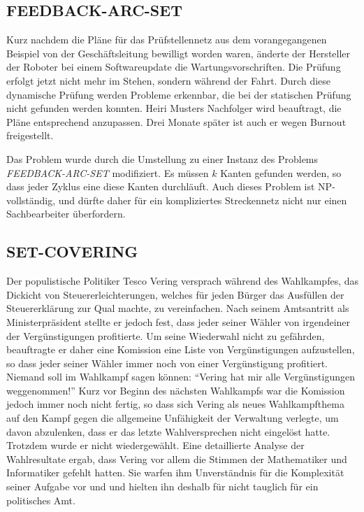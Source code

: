 \subsection{FEEDBACK-ARC-SET}
Kurz nachdem die Pläne für das Prüfstellennetz aus dem vorangegangenen
Beispiel von der Geschäftsleitung bewilligt worden waren, änderte
der Hersteller der Roboter bei einem Softwareupdate die Wartungsvorschriften.
Die Prüfung erfolgt jetzt nicht mehr im Stehen, sondern während der
Fahrt.
Durch diese dynamische Prüfung werden Probleme erkennbar, die bei der
statischen Prüfung nicht gefunden werden konnten. Heiri Musters
Nachfolger wird beauftragt, die Pläne entsprechend anzupassen.
Drei Monate später ist auch er wegen Burnout freigestellt.

\medskip

Das Problem wurde durch die Umstellung zu einer Instanz des
Problems {\it FEEDBACK-ARC-SET} modifiziert.
Es müssen $k$ Kanten gefunden werden, so dass jeder Zyklus eine
diese Kanten durchläuft. Auch dieses Problem ist NP-vollständig,
und dürfte daher für ein kompliziertes Streckennetz
nicht nur einen Sachbearbeiter überfordern.

\subsection{SET-COVERING}
Der populistische Politiker Tesco Vering versprach während des
Wahlkampfes, das Dickicht von Steuererleichterungen, welches
für jeden Bürger das Ausfüllen der Steuererklärung zur Qual
machte, zu vereinfachen.
Nach seinem Amtsantritt als Ministerpräsident 
stellte er jedoch fest, dass jeder seiner Wähler von irgendeiner
der Vergünstigungen profitierte. Um seine Wiederwahl nicht
zu gefährden, beauftragte er daher eine Komission eine Liste
von Vergünstigungen aufzustellen, so dass jeder seiner Wähler
immer noch von einer Vergünstigung profitiert. Niemand soll im
Wahlkampf sagen können: ``Vering hat mir alle Vergünstigungen weggenommen!''
Kurz vor Beginn des nächsten Wahlkampfs war die Komission jedoch
immer noch nicht fertig, so dass sich Vering als neues Wahlkampfthema
auf den Kampf gegen die allgemeine Unfähigkeit der Verwaltung verlegte,
um davon
abzulenken, dass er das letzte Wahlversprechen nicht eingelöst hatte.
Trotzdem wurde er nicht wiedergewählt. Eine detaillierte Analyse der
Wahlresultate ergab, dass Vering vor allem die Stimmen der Mathematiker und
Informatiker gefehlt hatten.
Sie warfen ihm Unverständnis für die Komplexität seiner Aufgabe vor und 
und hielten ihn deshalb für nicht tauglich für ein politisches Amt.


